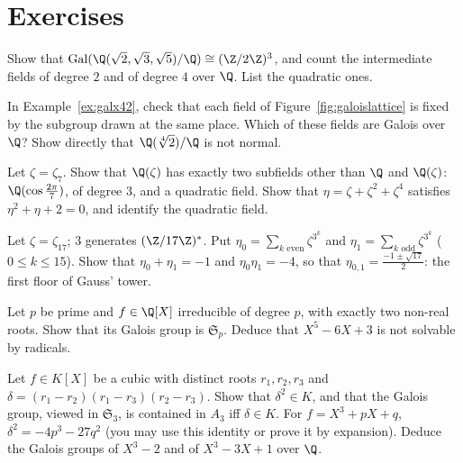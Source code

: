 \section{Exercises}

\begin{exercise}[$\star\star$]\label{ex:q235}
Show that $\operatorname{Gal}(\Q(\sqrt2,\sqrt3,\sqrt5)/\Q)\cong(\Z/2\Z)^3$, and count the intermediate fields of degree $2$ and of degree $4$ over $\Q$. List the quadratic ones.
\end{exercise}

\begin{exercise}[$\star\star$]\label{ex:x42check}
In Example~\ref{ex:galx42}, check that each field of Figure~\ref{fig:galoislattice} is fixed by the subgroup drawn at the same place. Which of these fields are Galois over $\Q$? Show directly that $\Q(\sqrt[4]2)/\Q$ is not normal.
\end{exercise}

\begin{exercise}[$\star\star$]\label{ex:zeta7}
Let $\zeta=\zeta_7$. Show that $\Q(\zeta)$ has exactly two subfields other than $\Q$ and $\Q(\zeta)$: $\Q(\cos\frac{2\pi}7)$, of degree $3$, and a quadratic field. Show that $\eta=\zeta+\zeta^2+\zeta^4$ satisfies $\eta^2+\eta+2=0$, and identify the quadratic field.
\end{exercise}

\begin{exercise}[$\star\star$]\label{ex:gauss17}
Let $\zeta=\zeta_{17}$; $3$ generates $(\Z/17\Z)^*$. Put $\eta_0=\sum_{k\text{ even}}\zeta^{3^k}$ and $\eta_1=\sum_{k\text{ odd}}\zeta^{3^k}$ ($0\le k\le15$). Show that $\eta_0+\eta_1=-1$ and $\eta_0\eta_1=-4$, so that $\eta_{0,1}=\frac{-1\pm\sqrt{17}}2$: the first floor of Gauss' tower.
\end{exercise}

\begin{exercise}[$\star\star$]\label{ex:sp}
Let $p$ be prime and $f\in\Q[X]$ irreducible of degree $p$, with exactly two non-real roots. Show that its Galois group is $\mathfrak S_p$. Deduce that $X^5-6X+3$ is not solvable by radicals.
\end{exercise}

\begin{exercise}[$\star\star$]\label{ex:discr}
Let $f\in K[X]$ be a cubic with distinct roots $r_1,r_2,r_3$ and $\delta=(r_1-r_2)(r_1-r_3)(r_2-r_3)$. Show that $\delta^2\in K$, and that the Galois group, viewed in $\mathfrak S_3$, is contained in $A_3$ iff $\delta\in K$. For $f=X^3+pX+q$, $\delta^2=-4p^3-27q^2$ (you may use this identity or prove it by expansion). Deduce the Galois groups of $X^3-2$ and of $X^3-3X+1$ over $\Q$.
\end{exercise}

